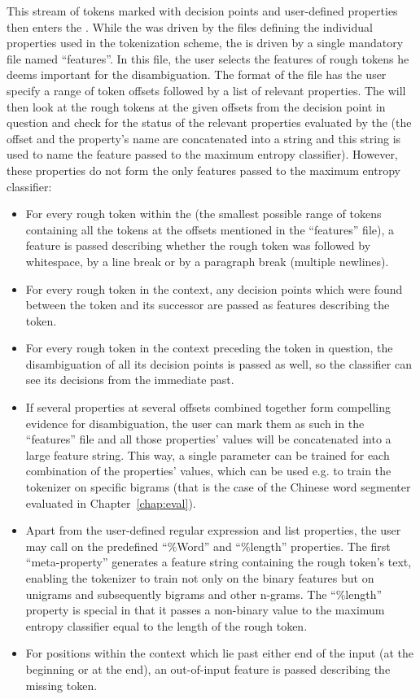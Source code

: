 This stream of tokens marked with decision points and user-defined properties
then enters the . While the  was
driven by the files defining the individual properties used in the tokenization
scheme, the  is driven by a single mandatory file named
``features''. In this file, the user selects the features of rough tokens he
deems important for the disambiguation. The format of the file has the user
specify a range of token offsets followed by a list of relevant properties.
The  will then look at the rough tokens at the given offsets
from the decision point in question and check for the status of the relevant
properties evaluated by the  (the offset and the
property's name are concatenated into a string and this string is used to name
the feature passed to the maximum entropy classifier). However, these
properties do not form the only features passed to the maximum entropy
classifier:
\begin{itemize}
  \item For every rough token within the  (the smallest
  possible range of tokens containing all the tokens at the offsets mentioned
  in the ``features'' file), a feature is passed describing whether the rough
  token was followed by whitespace, by a line break or by a paragraph break
  (multiple newlines).
  \item For every rough token in the context, any decision points which were
  found between the token and its successor are passed as features describing
  the token.
  \item For every rough token in the context preceding the token in question,
  the disambiguation of all its decision points is passed as well, so the
  classifier can see its decisions from the immediate past.
  \item If several properties at several offsets combined together form
  compelling evidence for disambiguation, the user can mark them as such in the
  ``features'' file and all those properties' values will be concatenated into
  a large feature string. This way, a single parameter can be trained for each
  combination of the properties' values, which can be used e.g. to train the
  tokenizer on specific bigrams (that is the case of the Chinese word segmenter
  evaluated in Chapter~\ref{chap:eval}).
  \item Apart from the user-defined regular expression and list properties, the
  user may call on the predefined ``\%Word'' and ``\%length'' properties. The
  first ``meta-property'' generates a feature string containing the rough
  token's text, enabling the tokenizer to train not only on the binary features
  but on unigrams and subsequently bigrams and other n-grams. The ``\%length''
  property is special in that it passes a non-binary value to the maximum
  entropy classifier equal to the length of the rough token.
  \item For positions within the context which lie past either end of the input
  (at the beginning or at the end), an out-of-input feature is passed
  describing the missing token.
\end{itemize}

